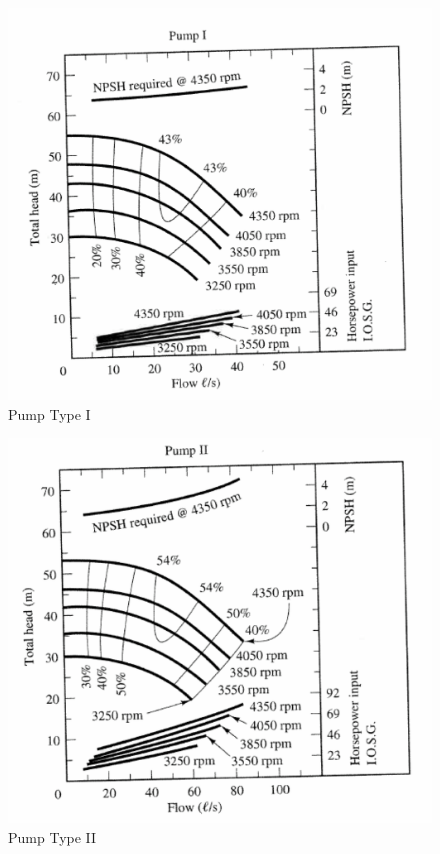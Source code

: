 \documentclass[12pt]{article}
\begin{document}
\begin{enumerate}
\begin{figure}[h!] %
\centering
   \includegraphics[width=6in]{pump1.png}
   \caption{Pump Type I}
   \label{fig:Pump1} 
\end{figure}

\begin{figure}[h!] %
\centering
   \includegraphics[width=6in]{pump2.png}
   \caption{Pump Type II}
   \label{fig:Pump2} 
\end{figure}


\end{enumerate}
\end{document}

